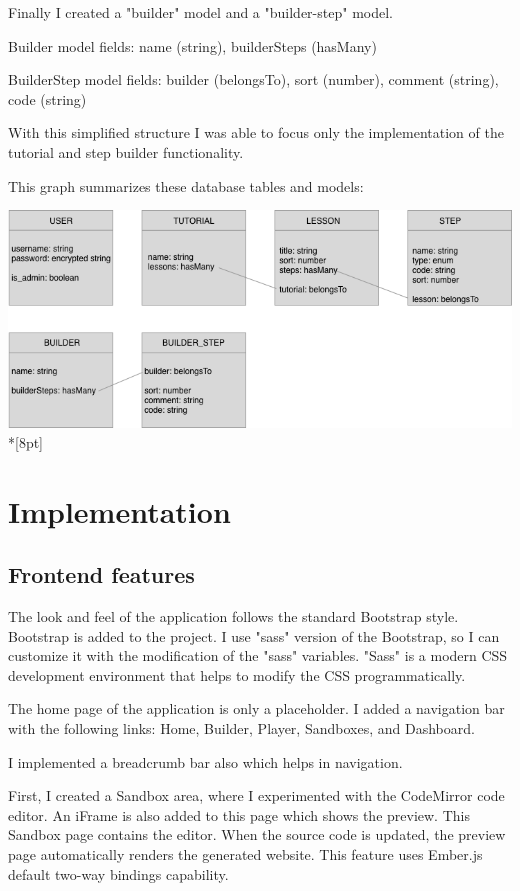 \documentclass[12pt, a4paper, oneside, openright, medskipamount]{report}
\begin{document}
Finally I created a "builder" model and a "builder-step" model.

Builder model fields: name (string), builderSteps (hasMany)

BuilderStep model fields: builder (belongsTo), sort (number), comment (string), code (string)

With this simplified structure I was able to focus only the implementation of the tutorial and step builder functionality.

This graph summarizes these database tables and models:

\includegraphics[width=1\textwidth]{assets/database-tables}\\*[8pt]


\chapter{Implementation}

\section{Frontend features}

The look and feel of the application follows the standard Bootstrap style. Bootstrap is added to the project. I use "sass" version of the Bootstrap, so I can customize it with the modification of the "sass" variables. "Sass" is a modern CSS development environment that helps to modify the CSS programmatically.

The home page of the application is only a placeholder. I added a navigation bar with the following links: Home, Builder, Player, Sandboxes, and Dashboard.

I implemented a breadcrumb bar also which helps in navigation.

First, I created a Sandbox area, where I experimented with the CodeMirror code editor. An iFrame is also added to this page which shows the preview. This Sandbox page contains the editor. When the source code is updated, the preview page automatically renders the generated website. This feature uses Ember.js default two-way bindings capability.
\end{document}
